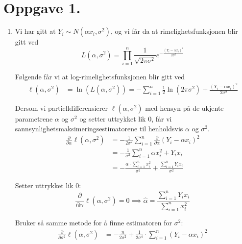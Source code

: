 \documentclass[a4paper,11pt,norsk]{article}
\begin{document}


\section*{Oppgave 1.}
\begin{enumerate}
    \item Vi har gitt at $Y_i \sim N(\alpha x_i, \sigma^2)$, og vi får da at 
        rimelighetsfunksjonen blir gitt ved 
        \[
            \mathit{L}(\alpha, \sigma^2) = \prod_{i=1}^{n}{\frac{1}{\sqrt{2\pi\sigma^2}} e^{-\frac{\left(Y_i - \alpha x_i\right)^2}{2\sigma^2}}}
        \]

        Følgende får vi at log-rimelighetsfunksjonen blir gitt ved
        \begin{align*}
            \ell(\alpha, \sigma^2) &= \ln{\left(\mathit{L}(\alpha, \sigma^2)\right)} = -\sum_{i=1}^{n}{\frac{1}{2}\ln{\left(2\pi\sigma^2\right) + \frac{\left(Y_i - \alpha x_i\right)^2}{2\sigma^2}}}
        \end{align*}

        Dersom vi partielldifferensierer $\ell(\alpha, \sigma^2)$ med hensyn på de ukjente parametrene $\alpha$ og $\sigma^2$ og setter uttrykket lik 0, får vi 
        sannsynlighetsmaksimeringsestimatorene til henholdsvis 
        $\alpha$ og $\sigma^2$.
        \begin{align*}
            \frac{\partial}{\partial \alpha} \ell(\alpha, \sigma^2) &= -\frac{1}{2\sigma^2} \sum_{i=1}^{n}{\frac{\partial}{\partial \alpha} \left(Y_i - \alpha x_i\right)^2} \\ 
                                                                    &= -\frac{1}{\sigma^2} \sum_{i=1}^{n}{\alpha x_i^2 + Y_i x_i} \\ 
                                                                    &= -\frac{\alpha \cdot \sum_{i=1}^{n}{x_i^2}}{\sigma^2} + \frac{\sum_{i=1}^{n}{Y_i x_i}}{\sigma^2}
        \end{align*}

        Setter uttrykket lik 0:
        \[
            \frac{\partial}{\partial \alpha} \ell(\alpha, \sigma^2) = 0 \implies \boxed{\hat{\alpha} = \frac{\sum_{i=1}^{n}{Y_i x_i}}{\sum_{i=1}^{n}{x_i^2}}}
        \]

        Bruker så samme metode for å finne estimatoren for $\sigma^2$:
        \begin{align*}
            \frac{\partial}{\partial \sigma^2} \ell(\alpha, \sigma^2) &= -\frac{n}{2\sigma^2} + \frac{1}{2\sigma^4} \cdot \sum_{i=1}^{n}{\left(Y_i - \alpha x_i\right)^2} 
        \end{align*}


\end{enumerate}
\end{document}
